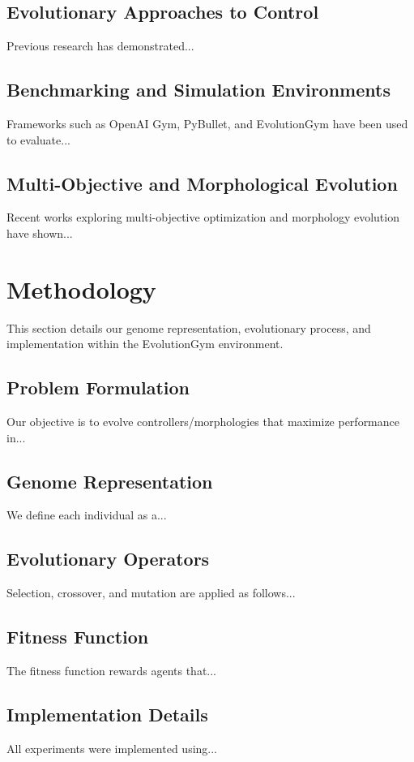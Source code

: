 \documentclass[journal,12pt,onecolumn]{IEEEtran}
\begin{document}
\subsection{Evolutionary Approaches to Control}
Previous research has demonstrated...

\subsection{Benchmarking and Simulation Environments}
Frameworks such as OpenAI Gym, PyBullet, and EvolutionGym have been used to evaluate...

\subsection{Multi-Objective and Morphological Evolution}
Recent works exploring multi-objective optimization and morphology evolution have shown...

\section{Methodology}
This section details our genome representation, evolutionary process, and implementation within the EvolutionGym environment.

\subsection{Problem Formulation}
Our objective is to evolve controllers/morphologies that maximize performance in...

\subsection{Genome Representation}
We define each individual as a...

\subsection{Evolutionary Operators}
Selection, crossover, and mutation are applied as follows...

\subsection{Fitness Function}
The fitness function rewards agents that...

\subsection{Implementation Details}
All experiments were implemented using...
\end{document}
